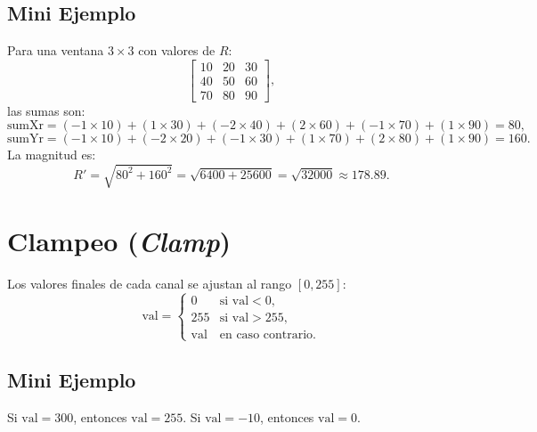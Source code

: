 \documentclass[11pt]{article}
\begin{document}
\subsection{Mini Ejemplo}
Para una ventana \(3 \times 3\) con valores de \(R\):
\[
\begin{bmatrix}
10 & 20 & 30\\
40 & 50 & 60\\
70 & 80 & 90
\end{bmatrix},
\]
las sumas son:
\[
\text{sumXr} = (-1 \times 10) + (1 \times 30) + (-2 \times 40) + (2 \times 60) + (-1 \times 70) + (1 \times 90) = 80,
\]
\[
\text{sumYr} = (-1 \times 10) + (-2 \times 20) + (-1 \times 30) + (1 \times 70) + (2 \times 80) + (1 \times 90) = 160.
\]
La magnitud es:
\[
R' = \sqrt{80^2 + 160^2} = \sqrt{6400 + 25600} = \sqrt{32000} \approx 178.89.
\]

\section{Clampeo (\textit{Clamp})}

Los valores finales de cada canal se ajustan al rango \([0, 255]\):
\[
\text{val} = 
\begin{cases}
0 & \text{si } \text{val} < 0,\\
255 & \text{si } \text{val} > 255,\\
\text{val} & \text{en caso contrario}.
\end{cases}
\]

\subsection{Mini Ejemplo}
Si \(\text{val} = 300\), entonces \(\text{val} = 255\). Si \(\text{val} = -10\), entonces \(\text{val} = 0\).
\end{document}
